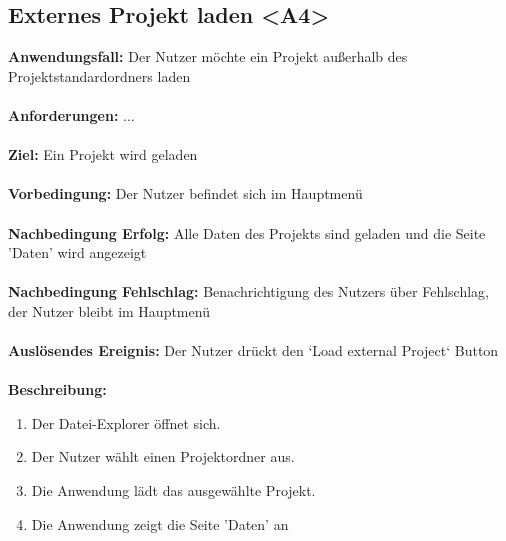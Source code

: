 \documentclass[parskip=full]{scrartcl} %
\begin{document}
\subsection*{Externes Projekt laden <A4>}
\textbf{Anwendungsfall:} Der Nutzer möchte ein Projekt außerhalb des Projektstandardordners laden\\\\
\textbf{Anforderungen:} ...\\\\
\textbf{Ziel:} Ein Projekt wird geladen \\\\
\textbf{Vorbedingung:} Der Nutzer befindet sich im Hauptmenü  \\\\
\textbf{Nachbedingung Erfolg:} Alle Daten des Projekts sind geladen und die Seite 'Daten' wird angezeigt \\\\
\textbf{Nachbedingung Fehlschlag:} Benachrichtigung des Nutzers über Fehlschlag, der Nutzer bleibt im Hauptmenü \\\\
\textbf{Auslösendes Ereignis:}  Der Nutzer drückt den `Load external Project` Button \\\\
\textbf{Beschreibung:}
\begin{enumerate}
    \item Der Datei-Explorer öffnet sich.
    \item Der Nutzer wählt einen Projektordner aus.
    \item Die Anwendung lädt das ausgewählte Projekt.
    \item Die Anwendung zeigt die Seite 'Daten' an
\end{enumerate}
\newpage
\end{document}
